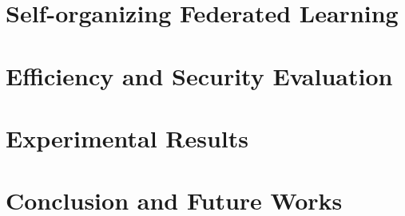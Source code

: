 \documentclass[journal]{IEEEtran}
\begin{document}
\section{Self-organizing Federated Learning}
\label{sec:sofl}



\section{Efficiency and Security Evaluation}
\label{sec:eval}



\section{Experimental Results}
\label{sec:exp}



\section{Conclusion and Future Works}
\label{sec:conc}






\end{document}

